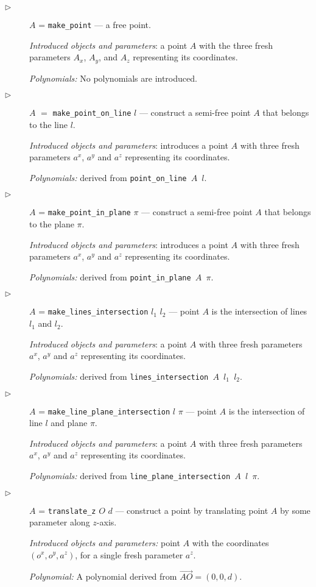 \documentclass[final,1p,times,authoryear]{elsarticle}
\begin{document}
\begin{description}

\item[$\triangleright$] $A$ = {\tt make\_point} --- a free point.

  {\em Introduced objects and parameters}: a point $A$ with the three
  fresh parameters $A_x$, $A_y$, and $A_z$ representing its
  coordinates.

  {\em Polynomials:} No polynomials are introduced.

\item[$\triangleright$] $A$ $=$ {\tt make\_point\_on\_line} $l$ ---
  construct a semi-free point $A$ that belongs to the line $l$.
  
  {\em Introduced objects and parameters}: introduces a point $A$ with
  three fresh parameters $a^x$, $a^y$ and $a^z$ representing its
  coordinates.

  {\em Polynomials:} derived from {\tt point\_on\_line $A$ $l$}.

\item[$\triangleright$] $A$ = {\tt make\_point\_in\_plane} $\pi$ ---
  construct a semi-free point $A$ that belongs to the plane $\pi$.

  {\em Introduced objects and parameters}: introduces a point $A$ with
  three fresh parameters $a^x$, $a^y$ and $a^z$ representing its
  coordinates.
  
  {\em Polynomials:} derived from {\tt point\_in\_plane $A$ $\pi$}.

\item[$\triangleright$] $A$ = {\tt make\_lines\_intersection} $l_1$
  $l_2$ --- point $A$ is the intersection of lines $l_1$ and $l_2$.

  {\em Introduced objects and parameters}: a point $A$ with three
  fresh parameters $a^x$, $a^y$ and $a^z$ representing its
  coordinates.

  {\em Polynomials:} derived from {\tt lines\_intersection $A$ $l_1$ $l_2$}.

\item[$\triangleright$] $A$ = {\tt make\_line\_plane\_intersection}
  $l$ $\pi$ --- point $A$ is the intersection of line $l$ and plane
  $\pi$.

  {\em Introduced objects and parameters}: a point $A$ with three
  fresh parameters $a^x$, $a^y$ and $a^z$ representing its
  coordinates.

  {\em Polynomials:} derived from {\tt line\_plane\_intersection $A$ $l$ $\pi$}.


\item[$\triangleright$]  $A$ = {\tt translate\_z} $O$ $d$ --- construct a
  point by translating point $A$ by some parameter along $z$-axis.

  {\em Introduced objects and parameters:} point $A$ with the
  coordinates $(o^x, o^y, a^z)$, for a single fresh parameter $a^z$.

  {\em Polynomial:} A polynomial derived from
  $\overrightarrow{AO} = (0, 0, d)$.
\end{description}
\end{document}
